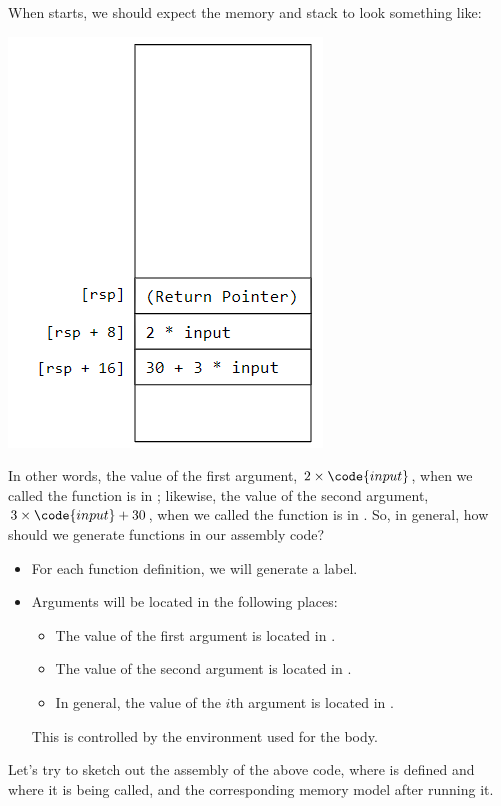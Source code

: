 When  starts, we should expect the memory and stack to look something like:
\begin{center}
    \includegraphics[scale=0.6]{assets/function_mem_layout_dec.png}
\end{center}
In other words, the value of the first argument, $2 \times \code{input}$, when we called the function is in \code{[rsp + 8]}; likewise, the value of the second argument, $3 \times \code{input} + 30$, when we called the function is in \code{[rsp + 16]}. So, in general, how should we generate functions in our assembly code? 
\begin{itemize}
    \item For each function definition, we will generate a label. 
    \item Arguments will be located in the following places: 
    \begin{itemize}
        \item The value of the first argument is located in \code{[rsp + 8]}. 
        \item The value of the second argument is located in \code{[rsp + 16]}.
        \item In general, the value of the $i$th argument is located in \code{[rsp + 8(i + 1)]}.
    \end{itemize}
    This is controlled by the environment used for the body. 
\end{itemize}

Let's try to sketch out the assembly of the above code, where  is defined and where it is being called, and the corresponding memory model after running it. 

